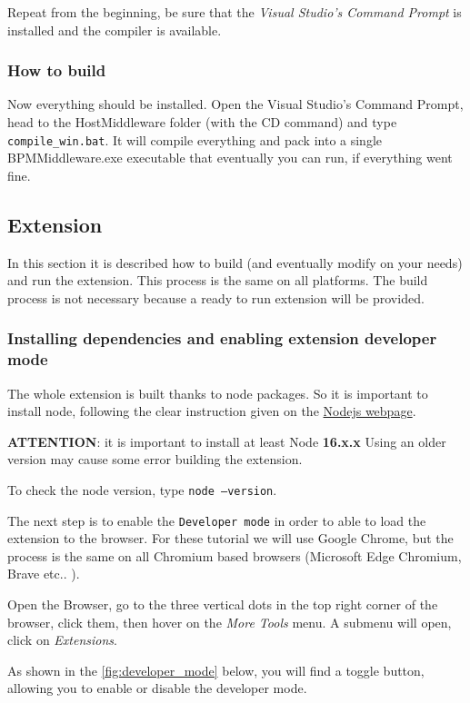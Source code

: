 Repeat from the beginning, be sure that the \textit{Visual Studio's Command Prompt} is installed and the compiler is available.

\subsubsection{How to build}
Now everything should be installed. Open the Visual Studio's Command Prompt, head to the HostMiddleware folder (with the CD command) and type \texttt{compile\_win.bat}. It will compile everything and pack into a single BPMMiddleware.exe executable that eventually you can run, if everything went fine.


\subsection{Extension}

In this section it is described how to build (and eventually modify on your needs) and run the extension. This process is the same on all platforms.
The build process is not necessary because a ready to run extension will be provided.

\subsubsection{Installing dependencies and enabling extension developer mode}
The whole extension is built thanks to node packages. So it is important to install node, following the clear instruction given on the \href{https://nodejs.org/}{Nodejs webpage}.

\begin{warning}
	\textbf{ATTENTION}: it is important to install at least Node \textbf{16.x.x} Using an older version may cause some error building the extension.
\end{warning}
To check the node version, type \texttt{node --version}. 

The next step is to enable the \texttt{Developer mode} in order to able to load the extension to the browser. For these tutorial we will use Google Chrome, but the process is the same on all Chromium based browsers (Microsoft Edge Chromium, Brave etc.. ).

Open the Browser, go to the three vertical dots in the top right corner of the browser, click them, then hover on the \textit{More Tools} menu. A submenu will open, click on \textit{Extensions}.

As shown in the \autoref{fig:developer_mode} below, you will find a toggle button, allowing you to enable or disable the developer mode.


